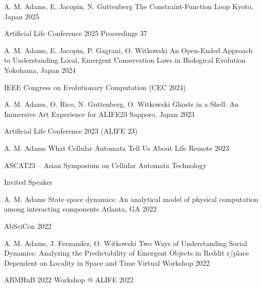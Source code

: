 
\begin{cventries}

\cventry
    {\textcolor{cmyk-magenta}{A. M. Adams}, E. Jacopin, N. Guttenberg}
    {The Constraint-Function Loop}
    {Kyoto, Japan}
    {2025}
    {
      \begin{cvitems}
        \item {Artificial Life Conference 2025 Proceedings 37}
      \end{cvitems}
    }

\cventry
    {\textcolor{cmyk-magenta}{A. M. Adams}, E. Jacopin, P. Gagrani, O. Witkowski}
    {An Open-Ended Approach to Understanding Local, Emergent Conservation Laws in Biological Evolution}
    {Yokohama, Japan}
    {2024}
    {
      \begin{cvitems}
        \item {IEEE Congress on Evolutionary Computation (CEC 2024)}
      \end{cvitems}
    }

\cventry
    {\textcolor{cmyk-magenta}{A. M. Adams}, O. Rico, N. Guttenberg, O. Witkowski}
    {Ghosts in a Shell: An Immersive Art Experience for ALIFE23}
    {Sapporo, Japan}
    {2023}
    {
      \begin{cvitems}
        \item {Artificial Life Conference 2023 (ALIFE 23)}
      \end{cvitems}
    }

\cventry
    {\textcolor{cmyk-magenta}{A. M. Adams}}
    {What Cellular Automata Tell Us About Life}
    {Remote}
    {2023}
    {
      \begin{cvitems}
        \item{ASCAT23 – Asian Symposium on Cellular Automata Technology}
        \item {Invited Speaker}
      \end{cvitems}
    }

\cventry
    {\textcolor{cmyk-magenta}{A. M. Adams}}
    {State space dynamics: An analytical model of physical computation among interacting components}
    {Atlanta, GA}
    {2022}
    {
      \begin{cvitems}
        \item {AbSciCon 2022}
      \end{cvitems}
    }
    
\cventry
    {\textcolor{cmyk-magenta}{A. M. Adams}, J. Fernandez, O. Witkowski}
    {Two Ways of Understanding Social Dynamics: Analyzing the Predictability of Emergent Objects in Reddit r/place Dependent on Locality in Space and Time}
    {Virtual Workshop}
    {2022}
    {
      \begin{cvitems}
        \item {ABMHuB 2022 Workshop @ ALIFE 2022}
      \end{cvitems}
    }
    

\end{cventries}
